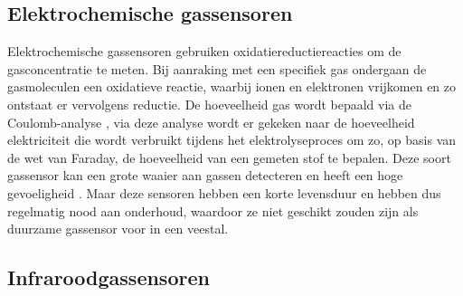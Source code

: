 \subsection{Elektrochemische gassensoren}
\label{subsec:elektrochemische}

Elektrochemische gassensoren gebruiken oxidatiereductiereacties om de gasconcentratie te meten. Bij aanraking met een specifiek gas ondergaan de gasmoleculen een oxidatieve reactie, waarbij ionen en elektronen vrijkomen en zo ontstaat er vervolgens reductie. De hoeveelheid gas wordt bepaald via de Coulomb-analyse
, via deze analyse wordt er gekeken naar de hoeveelheid elektriciteit die wordt verbruikt tijdens het elektrolyseproces om zo, op basis van de wet van Faraday, de hoeveelheid van een gemeten stof te bepalen. Deze soort gassensor kan een grote waaier aan gassen detecteren en heeft een hoge gevoeligheid
. Maar deze sensoren hebben een korte levensduur en hebben dus regelmatig nood aan onderhoud, waardoor ze niet geschikt zouden zijn als duurzame gassensor voor in een veestal.



\subsection{Infraroodgassensoren}
\label{subsec:infrarood}


